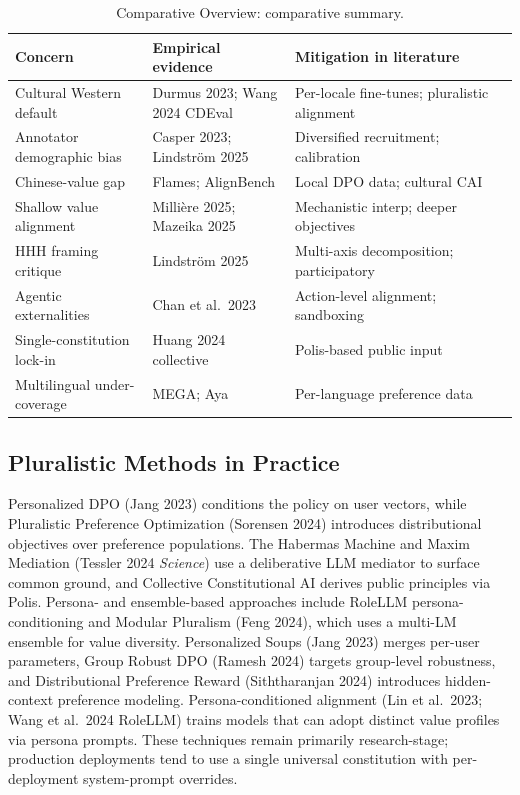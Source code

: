 \documentclass{article}
\begin{document}
\begin{table}[t]
\centering
\caption{Comparative Overview: comparative summary.}
\label{tab:comparative-overview-3}
\begin{tabular}{>{\raggedright\arraybackslash}p{0.2700\linewidth}
  >{\raggedright\arraybackslash}p{0.2900\linewidth}
  >{\raggedright\arraybackslash}p{0.4400\linewidth}}
\toprule
Concern & Empirical evidence & Mitigation in literature \\
\midrule
Cultural Western default & Durmus 2023; Wang 2024 CDEval & Per-locale fine-tunes; pluralistic alignment \\
Annotator demographic bias & Casper 2023; Lindström 2025 & Diversified recruitment; calibration \\
Chinese-value gap & Flames; AlignBench & Local DPO data; cultural CAI \\
Shallow value alignment & Millière 2025; Mazeika 2025 & Mechanistic interp; deeper objectives \\
HHH framing critique & Lindström 2025 & Multi-axis decomposition; participatory \\
Agentic externalities & Chan et al.~2023 & Action-level alignment; sandboxing \\
Single-constitution lock-in & Huang 2024 collective & Polis-based public input \\
Multilingual under-coverage & MEGA; Aya & Per-language preference data \\
\end{tabular}
\end{table}

\subsection{Pluralistic Methods in Practice}\label{pluralistic-methods-in-practice}

Personalized DPO (Jang 2023) conditions the policy on user vectors, while Pluralistic Preference Optimization (Sorensen 2024) introduces distributional objectives over preference populations. The Habermas Machine and Maxim Mediation (Tessler 2024 \emph{Science}) use a deliberative LLM mediator to surface common ground, and Collective Constitutional AI \citep{huang2024collectiveconstitu} derives public principles via Polis. Persona- and ensemble-based approaches include RoleLLM persona-conditioning \citep{wang2024cdevalabenchmarkfo} and Modular Pluralism (Feng 2024), which uses a multi-LM ensemble for value diversity. Personalized Soups (Jang 2023) merges per-user parameters, Group Robust DPO (Ramesh 2024) targets group-level robustness, and Distributional Preference Reward (Siththaranjan 2024) introduces hidden-context preference modeling. Persona-conditioned alignment (Lin et al.~2023; Wang et al.~2024 RoleLLM) trains models that can adopt distinct value profiles via persona prompts. These techniques remain primarily research-stage; production deployments tend to use a single universal constitution with per-deployment system-prompt overrides.
\end{document}
